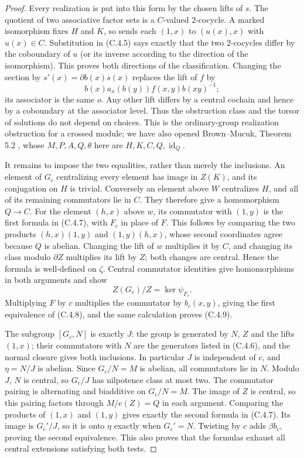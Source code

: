 \begin{proof}
Every realization is put into this form by the chosen lifts of $s$.
The quotient of two associative factor sets is a $C$-valued $2$-cocycle.
A marked isomorphism fixes $H$ and $K$, so sends each $(1,x)$ to
$(u(x),x)$ with $u(x)\in C$.  Substitution in (C.4.5) says exactly
that the two $2$-cocycles differ by the coboundary of $u$ (or its
inverse according to the direction of the isomorphism).  This proves
both directions of the classification.  Changing the section by
$s'(x)=\partial b(x)s(x)$ replaces the lift of $f$ by
\[
 b(x)a_x(b(y))f(x,y)b(xy)^{-1};
\]
its associator is the same $o$.  Any other lift differs by a central
cochain and hence by a coboundary at the associator level.  Thus the
obstruction class and the torsor of solutions do not depend on choices.
This is the ordinary-group realization obstruction for a crossed module;
we have also opened Brown--Mucuk, Theorem 5.2
\cite{C4-BrownMucuk1994}, whose $M,P,A,Q,\theta$ here are
$H,K,C,Q,\operatorname{id}_Q$.

It remains to impose the two equalities, rather than merely the
inclusions.  An element of $G_c$ centralizing every element has image
in $Z(K)$, and its conjugation on $H$ is trivial.  Conversely an element
above $W$ centralizes $H$, and all of its remaining commutators lie in
$C$.  They therefore give a homomorphism $Q\to C$.  For the element
$(h,x)$ above $w$, its commutator with $(1,y)$ is the first formula
in (C.4.7), with $F_c$ in place of $F$.  This follows by comparing the
two products $(h,x)(1,y)$ and $(1,y)(h,x)$, whose second coordinates
agree because $Q$ is abelian.  Changing the lift of $w$ multiplies it
by $C$, and changing its class modulo $\partial Z$ multiplies its lift
by $Z$; both changes are central.  Hence the formula is well-defined
on $\zeta$.  Central commutator identities give homomorphisms in both
arguments and show
\[
                  Z(G_c)/Z=\ker\psi_{F_c}.
\]
Multiplying $F$ by $c$ multiplies the commutator by
$b_c(x,y)$, giving the first equivalence of (C.4.8), and the same
calculation proves (C.4.9).

The subgroup $[G_c,N]$ is exactly $J$: the group is generated by $N$,
$Z$ and the lifts $(1,x)$; their commutators with $N$ are the generators
listed in (C.4.6), and the normal closure gives both inclusions.
In particular $J$ is independent of $c$, and $\eta=N/J$ is abelian.
Since $G_c/N=M$ is abelian, all commutators lie in $N$.  Modulo $J$,
$N$ is central, so $G_c/J$ has nilpotence class at most two.  The
commutator pairing is alternating and biadditive on $G_c/N=M$.
The image of $Z$ is central, so this pairing factors through
$M/e(Z)=Q$ in each argument.  Comparing the products of $(1,x)$ and
$(1,y)$ gives exactly the second formula in (C.4.7).  Its image is
$G_c'/J$, so it is onto $\eta$ exactly when $G_c'=N$.  Twisting by
$c$ adds $\beta b_c$, proving the second equivalence.  This also proves
that the formulas exhaust all central extensions satisfying both tests.
\end{proof}

